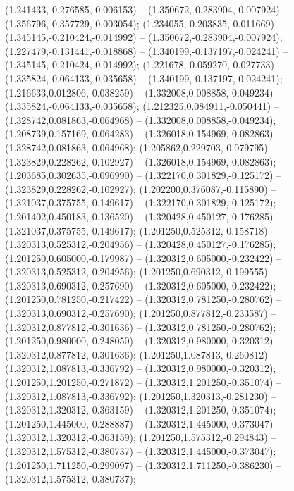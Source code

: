  (1.241433,-0.276585,-0.006153) -- (1.350672,-0.283904,-0.007924) -- (1.356796,-0.357729,-0.003054);
 (1.234055,-0.203835,-0.011669) -- (1.345145,-0.210424,-0.014992) -- (1.350672,-0.283904,-0.007924);
 (1.227479,-0.131441,-0.018868) -- (1.340199,-0.137197,-0.024241) -- (1.345145,-0.210424,-0.014992);
 (1.221678,-0.059270,-0.027733) -- (1.335824,-0.064133,-0.035658) -- (1.340199,-0.137197,-0.024241);
 (1.216633,0.012806,-0.038259) -- (1.332008,0.008858,-0.049234) -- (1.335824,-0.064133,-0.035658);
 (1.212325,0.084911,-0.050441) -- (1.328742,0.081863,-0.064968) -- (1.332008,0.008858,-0.049234);
 (1.208739,0.157169,-0.064283) -- (1.326018,0.154969,-0.082863) -- (1.328742,0.081863,-0.064968);
 (1.205862,0.229703,-0.079795) -- (1.323829,0.228262,-0.102927) -- (1.326018,0.154969,-0.082863);
 (1.203685,0.302635,-0.096990) -- (1.322170,0.301829,-0.125172) -- (1.323829,0.228262,-0.102927);
 (1.202200,0.376087,-0.115890) -- (1.321037,0.375755,-0.149617) -- (1.322170,0.301829,-0.125172);
 (1.201402,0.450183,-0.136520) -- (1.320428,0.450127,-0.176285) -- (1.321037,0.375755,-0.149617);
 (1.201250,0.525312,-0.158718) -- (1.320313,0.525312,-0.204956) -- (1.320428,0.450127,-0.176285);
 (1.201250,0.605000,-0.179987) -- (1.320312,0.605000,-0.232422) -- (1.320313,0.525312,-0.204956);
 (1.201250,0.690312,-0.199555) -- (1.320313,0.690312,-0.257690) -- (1.320312,0.605000,-0.232422);
 (1.201250,0.781250,-0.217422) -- (1.320312,0.781250,-0.280762) -- (1.320313,0.690312,-0.257690);
 (1.201250,0.877812,-0.233587) -- (1.320312,0.877812,-0.301636) -- (1.320312,0.781250,-0.280762);
 (1.201250,0.980000,-0.248050) -- (1.320312,0.980000,-0.320312) -- (1.320312,0.877812,-0.301636);
 (1.201250,1.087813,-0.260812) -- (1.320312,1.087813,-0.336792) -- (1.320312,0.980000,-0.320312);
 (1.201250,1.201250,-0.271872) -- (1.320312,1.201250,-0.351074) -- (1.320312,1.087813,-0.336792);
 (1.201250,1.320313,-0.281230) -- (1.320312,1.320312,-0.363159) -- (1.320312,1.201250,-0.351074);
 (1.201250,1.445000,-0.288887) -- (1.320312,1.445000,-0.373047) -- (1.320312,1.320312,-0.363159);
 (1.201250,1.575312,-0.294843) -- (1.320312,1.575312,-0.380737) -- (1.320312,1.445000,-0.373047);
 (1.201250,1.711250,-0.299097) -- (1.320312,1.711250,-0.386230) -- (1.320312,1.575312,-0.380737);
